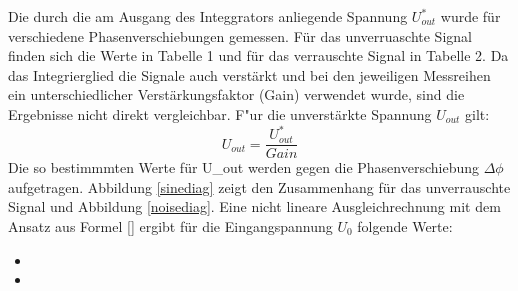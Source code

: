 Die durch die am Ausgang des Integgrators anliegende Spannung $U_{out}^*$ wurde f\"ur verschiedene Phasenverschiebungen gemessen. F\"ur das unverruaschte Signal finden sich die Werte in Tabelle 1 und f\"ur das verrauschte Signal in Tabelle 2. Da das Integrierglied die Signale auch verst\"arkt und bei den jeweiligen Messreihen ein unterschiedlicher Verst\"arkungsfaktor (Gain) verwendet wurde, sind die Ergebnisse nicht direkt vergleichbar. F"ur die unverst\"arkte Spannung $U_{out}$ gilt:
\begin{equation}
U_{out} = \frac{U_{out}^*}{Gain}
\end{equation}
Die so bestimmmten Werte f\"ur U_{out} werden gegen die Phasenverschiebung $\Delta \phi$ aufgetragen. Abbildung \ref{sinediag} zeigt den Zusammenhang f\"ur das unverrauschte Signal und Abbildung \ref{noisediag}. Eine nicht lineare Ausgleichrechnung mit dem Ansatz aus Formel \ref{} ergibt f\"ur die Eingangspannung $U_0$ folgende Werte:
\begin{itemize}
\item
\item
\end{itemize} 

